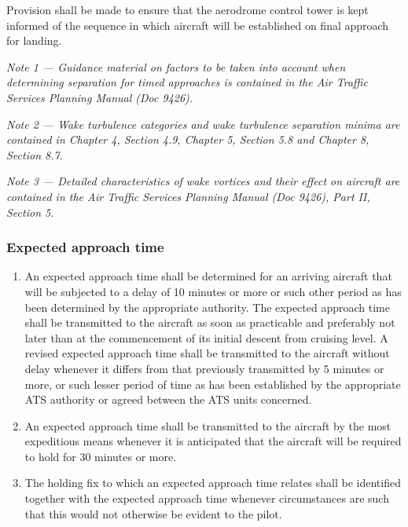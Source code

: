 \documentclass[../main.tex]{subfiles}
\begin{document}
\begin{enumerate}[itemsep=0.2cm]
\begin{enumerate}[labelindent=0pt,itemsep=0.2cm]
            \noindent Provision shall be made to ensure that the aerodrome control tower is kept informed of the sequence in which aircraft will be established on final approach for landing.

            \textit{Note 1 --- Guidance material on factors to be taken into account when determining separation for timed approaches is contained in the \emph{Air Traffic Services Planning Manual} (Doc 9426).}

            \textit{Note 2 --- Wake turbulence categories and wake turbulence separation minima are contained in Chapter 4, Section 4.9, Chapter 5, Section 5.8 and Chapter 8, Section 8.7.}

            \textit{Note 3 --- Detailed characteristics of wake vortices and their effect on aircraft are contained in the \emph{Air Traffic Services Planning Manual} (Doc 9426), Part II, Section 5.}
        \end{enumerate}
    \end{enumerate}

    \subsubsection{Expected approach time}

    \begin{enumerate}
        \item An expected approach time shall be determined for an arriving aircraft that will be subjected to a delay of 10 minutes or more or such other period as has been determined by the appropriate authority. The expected approach time shall be transmitted to the aircraft as soon as practicable and preferably not later than at the commencement of its initial descent from cruising level. A revised expected approach time shall be transmitted to the aircraft without delay whenever it differs from that previously transmitted by 5 minutes or more, or such lesser period of time as has been established by the appropriate ATS authority or agreed between the ATS units concerned.
        \item An expected approach time shall be transmitted to the aircraft by the most expeditious means whenever it is anticipated that the aircraft will be required to hold for 30 minutes or more.
        \item The holding fix to which an expected approach time relates shall be identified together with the expected approach time whenever circumstances are such that this would not otherwise be evident to the pilot.
    \end{enumerate}
\end{document}
